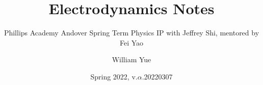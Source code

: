 \documentclass[11pt, oneside]{scrbook}
\begin{document}
\title{Electrodynamics Notes}
\subtitle{Phillips Academy Andover Spring Term Physics IP with Jeffrey Shi, mentored by Fei Yao}
\author{William Yue}
\date{Spring 2022, v.$\alpha$.20220307}
\maketitle


\end{document}
